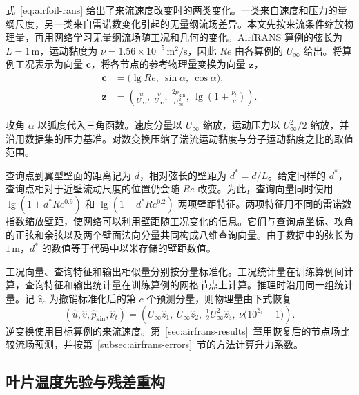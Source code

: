 \documentclass[a4paper,fleqn]{cas-sc}
\newcommand{\subsectionbudget}[1]{%
  \noindent{\small\textbf{版面预算}\enspace 约 #1 页}\par\nobreak
}
\begin{document}
式~\eqref{eq:airfoil-rans} 给出了来流速度改变时的两类变化。一类来自速度和压力的量纲尺度，另一类来自雷诺数变化引起的无量纲流场差异。本文先按来流条件缩放物理量，再用网络学习无量纲流场随工况和几何的变化。AirfRANS 算例的弦长为 $L=1\,\mathrm{m}$，运动黏度为 $\nu=1.56\times10^{-5}\,\mathrm{m^2/s}$，因此 $Re$ 由各算例的 $U_\infty$ 给出。将算例工况表示为向量 $\mathbf{c}$，将各节点的参考物理量变换为向量 $\mathbf{z}$，
\begin{equation}
  \label{eq:airfoil-forward}
  \begin{aligned}
    \mathbf{c} &= \bigl(\lg Re,\ \sin\alpha,\ \cos\alpha\bigr), \\
    \mathbf{z} &= \left(
      \frac{u}{U_\infty},\ \frac{v}{U_\infty},\
      \frac{2p_{\mathrm{kin}}}{U_\infty^2},\
      \lg\!\left(1+\frac{\nu_t}{\nu}\right)
    \right).
  \end{aligned}
\end{equation}

攻角 $\alpha$ 以弧度代入三角函数。速度分量以 $U_\infty$ 缩放，运动压力以 $U_\infty^2/2$ 缩放，并沿用数据集的压力基准。对数变换压缩了湍流运动黏度与分子运动黏度之比的取值范围。

查询点到翼型壁面的距离记为 $d$，相对弦长的壁距为 $d^*=d/L$。给定同样的 $d^*$，查询点相对于近壁流动尺度的位置仍会随 $Re$ 改变\citep{Schlichting2017}。为此，查询向量同时使用 $\lg(1+d^*Re^{0.9})$ 和 $\lg(1+d^*Re^{0.2})$ 两项壁距特征。两项特征用不同的雷诺数指数缩放壁距，使网络可以利用壁距随工况变化的信息。它们与查询点坐标、攻角的正弦和余弦以及两个壁面法向分量共同构成八维查询向量。由于数据中的弦长为 $1\,\mathrm{m}$，$d^*$ 的数值等于代码中以米存储的壁距数值。

工况向量、查询特征和输出相似量分别按分量标准化。工况统计量在训练算例间计算，查询特征和输出统计量在训练算例的网格节点上计算。推理时沿用同一组统计量。记 $\widehat z_c$ 为撤销标准化后的第 $c$ 个预测分量，则物理量由下式恢复
\begin{equation}
  \label{eq:airfoil-inverse}
  (\widehat u,\widehat v,\widehat p_{\mathrm{kin}},\widehat\nu_t)
  = \left(
    U_\infty\widehat z_1,\ U_\infty\widehat z_2,\
    \tfrac12 U_\infty^2\widehat z_3,\
    \nu\bigl(10^{\widehat z_4}-1\bigr)
  \right).
\end{equation}
逆变换使用目标算例的来流速度。第~\ref{sec:airfrans-results}~章用恢复后的节点场比较流场预测，并按第~\ref{subsec:airfrans-errors}~节的方法计算升力系数。

\subsection{叶片温度先验与残差重构}\label{subsec:blade-prior}
\subsectionbudget{1.50}
\end{document}
